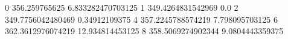 0 356.259765625 6.833282470703125
1 349.4264831542969 0.0
2 349.7756042480469 0.34912109375
4 357.2245788574219 7.798095703125
6 362.3612976074219 12.934814453125
8 358.5069274902344 9.0804443359375
